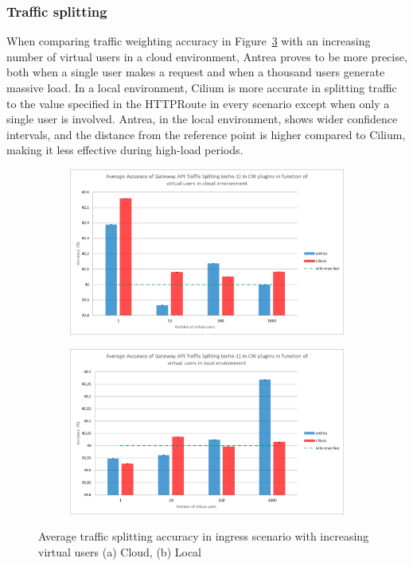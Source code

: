 \subsubsection{Traffic splitting}
\label{sec:ingressTrafficSplitting}

When comparing traffic weighting accuracy in Figure~\ref{fig:vus_avg} with an increasing number of virtual users in a cloud environment, Antrea proves to be more precise, both when a single user makes a request and when a thousand users generate massive load. In a local environment, Cilium is more accurate in splitting traffic to the value specified in the HTTPRoute in every scenario except when only a single user is involved. Antrea, in the local environment, shows wider confidence intervals, and the distance from the reference point is higher compared to Cilium, making it less effective during high-load periods.


\begin{figure}[H]
    \centering
    \begin{subfigure}[b]{0.6\textwidth}
        \includegraphics[width=\textwidth]{plots/traffic-splitting/vus_cloud_all.png}
        \caption{}
        \label{fig:vus_cloud_avg}
    \end{subfigure}
    \begin{subfigure}[b]{0.6\textwidth}
        \includegraphics[width=\textwidth]{plots/traffic-splitting/vus_local_all.png}
        \caption{}
        \label{fig:vus_local_avg}
    \end{subfigure}
    
    \caption{Average traffic splitting accuracy in ingress scenario with increasing virtual users (a) Cloud, (b) Local}
    \label{fig:vus_avg}
\end{figure}



